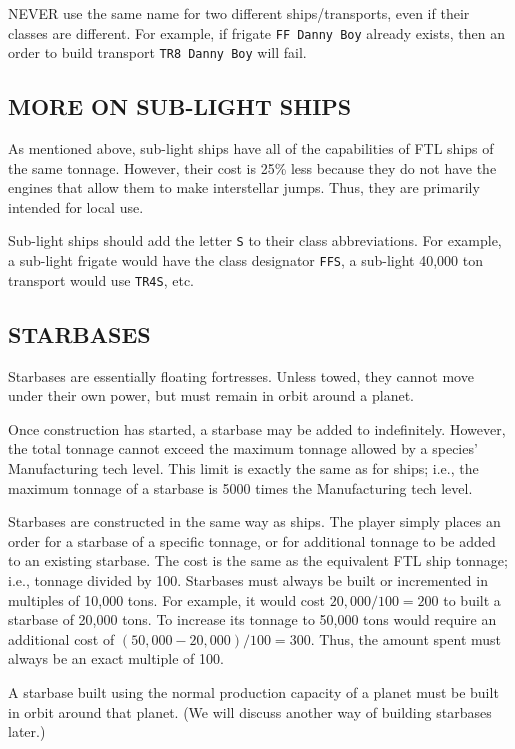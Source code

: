 \documentclass[10pt,titlepage]{article}
\begin{document}
NEVER use the same name for two different ships/transports, even if their
classes are different.  For example, if frigate \texttt{FF Danny Boy} already
exists, then an order to build transport \texttt{TR8 Danny Boy} will fail.


\subsection{MORE ON SUB-LIGHT SHIPS}
\label{sec:moreonsublightships}


As mentioned above, sub-light ships have all of the capabilities of FTL ships
of the same tonnage.  However, their cost is 25\% less because they do not
have the engines that allow them to make interstellar jumps.  Thus, they
are primarily intended for local use.

Sub-light ships should add the letter \texttt{S} to their class abbreviations.  For
example, a sub-light frigate would have the class designator \texttt{FFS}, a sub-light
40,000 ton transport would use \texttt{TR4S}, etc.


\subsection{STARBASES}
\label{sec:starbases}


Starbases are essentially floating fortresses.  Unless towed, they cannot
move under their own power, but must remain in orbit around a planet.

Once construction has started, a starbase may be added to indefinitely.
However, the total tonnage cannot exceed the maximum tonnage allowed by
a species' Manufacturing tech level.  This limit is exactly the same as
for ships; i.e., the maximum tonnage of a starbase is 5000 times the
Manufacturing tech level.

Starbases are constructed in the same way as ships.  The player simply places
an order for a starbase of a specific tonnage, or for additional tonnage to
be added to an existing starbase.  The cost is the same as the equivalent FTL
ship tonnage; i.e., tonnage divided by 100.  Starbases must always be built
or incremented in multiples of 10,000 tons.  For example, it would cost
$20,000/100 = 200$ to built a starbase of 20,000 tons.  To increase its tonnage
to 50,000 tons would require an additional cost of $(50,000-20,000)/100=300$.
Thus, the amount spent must always be an exact multiple of 100.

A starbase built using the normal production capacity of a planet must be
built in orbit around that planet.  (We will discuss another way of building
starbases later.)
\end{document}
